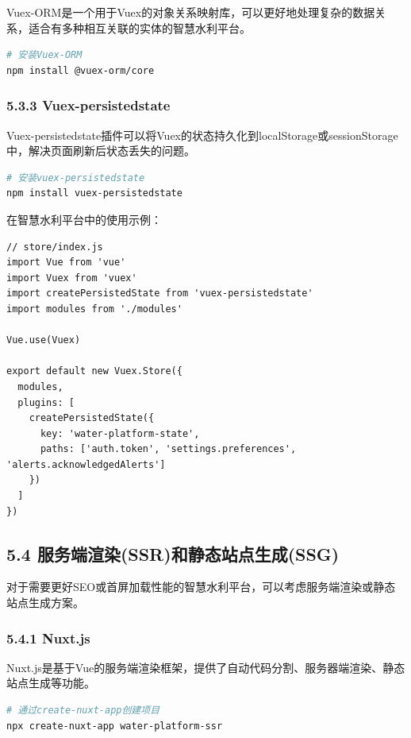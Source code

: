 Vuex-ORM是一个用于Vuex的对象关系映射库，可以更好地处理复杂的数据关系，适合有多种相互关联的实体的智慧水利平台。

\begin{lstlisting}[language=bash]
# 安装Vuex-ORM
npm install @vuex-orm/core
\end{lstlisting}

\subsubsection{5.3.3 Vuex-persistedstate}\label{vuex-persistedstate}

Vuex-persistedstate插件可以将Vuex的状态持久化到localStorage或sessionStorage中，解决页面刷新后状态丢失的问题。

\begin{lstlisting}[language=bash]
# 安装vuex-persistedstate
npm install vuex-persistedstate
\end{lstlisting}

在智慧水利平台中的使用示例：

\begin{lstlisting}
// store/index.js
import Vue from 'vue'
import Vuex from 'vuex'
import createPersistedState from 'vuex-persistedstate'
import modules from './modules'

Vue.use(Vuex)

export default new Vuex.Store({
  modules,
  plugins: [
    createPersistedState({
      key: 'water-platform-state',
      paths: ['auth.token', 'settings.preferences', 'alerts.acknowledgedAlerts']
    })
  ]
})
\end{lstlisting}

\subsection{5.4
服务端渲染(SSR)和静态站点生成(SSG)}\label{ux670dux52a1ux7aefux6e32ux67d3ssrux548cux9759ux6001ux7ad9ux70b9ux751fux6210ssg}

对于需要更好SEO或首屏加载性能的智慧水利平台，可以考虑服务端渲染或静态站点生成方案。

\subsubsection{5.4.1 Nuxt.js}\label{nuxt.js}

Nuxt.js是基于Vue的服务端渲染框架，提供了自动代码分割、服务器端渲染、静态站点生成等功能。

\begin{lstlisting}[language=bash]
# 通过create-nuxt-app创建项目
npx create-nuxt-app water-platform-ssr
\end{lstlisting}

